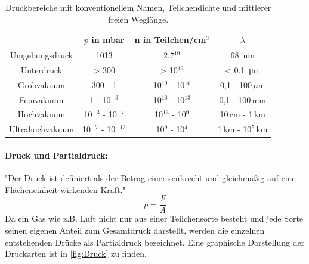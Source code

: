 \begin{table}
  \centering
  \caption{Druckbereiche mit konventionellem Namen, Teilchendichte und mittlerer freien Weglänge.}
  \label{tab:Vakuum}
  \begin{tabular}{cccc}
    \toprule
    &$p$ in mbar & n in Teilchen/cm$^3$ & $\lambda$ \\
    \midrule
    Umgebungsdruck & 1013 & 2,7\cdot10$^{19}$ & \SI{68}{\nano\meter} \\
    Unterdruck & > 300 & > 10$^{19}$ & < \SI{0.1}{\micro\meter} \\
    Grobvakuum & 300 - 1 & 10$^{19}$ - 10$^{16}$ & 0,1 - 100$\,\mu$m \\
    Feinvakuum & 1 - 10$^{-3}$ & 10$^{16}$ - 10$^{13}$ & 0,1 - 100$\,$mm \\
    Hochvakuum & 10$^{-3}$ - 10$^{-7}$ & 10$^{13}$ - 10$^{9}$ & 10$\,$cm - 1$\,$km \\
    Ultrahochvakuum & 10$^{-7}$ - 10$^{-12}$ & 10$^{9}$ - 10$^{4}$ & 1$\,$km - 10$^5\,$km \\
  \end{tabular}
\end{table}

\paragraph{Druck und Partialdruck:}
"Der Druck ist definiert als der Betrag einer senkrecht und gleichmäßig auf eine Flächeneinheit wirkenden Kraft."\cite{pfeiffer}
\begin{equation}
  p = \frac{F}{A}
\end{equation}
Da ein Gas wie z.B. Luft nicht nur aus einer Teilchensorte besteht und jede Sorte seinen eigenen Anteil zum Gesamtdruck darstellt, werden
die einzelnen entstehenden Drücke als Partialdruck bezeichnet. Eine graphische Darstellung der Druckarten ist in \ref{fig:Druck} zu finden.

